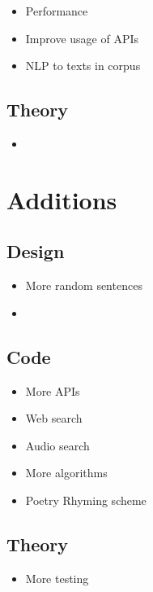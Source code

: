 \begin{itemize}
  \item Performance
  \item Improve usage of APIs
  \item NLP to texts in corpus
\end{itemize}

\subsection{Theory}

\begin{itemize}
  \item
\end{itemize}


\section{Additions}

\subsection{Design}

\begin{itemize}
  \item More random sentences
  \item
\end{itemize}

\subsection{Code}

\begin{itemize}
  \item More APIs
  \item Web search
  \item Audio search
  \item More algorithms
  \item Poetry Rhyming scheme
\end{itemize}

\subsection{Theory}

\begin{itemize}
  \item More testing
\end{itemize}


\stopcontents[chapters]
